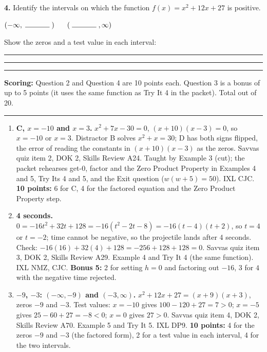 \documentclass[11pt]{article}
\newcommand{\workline}{\par\vspace{12pt}\noindent\rule{\linewidth}{0.4pt}\par}
\begin{document}
\vspace{6pt}
\textbf{4.} Identify the intervals on which the function $f(x)=x^2+12x+27$ is positive.

\vspace{8pt}
\hspace{2em}$\Large(-\infty,\;\rule{1.2cm}{0.4pt}\;)$ \  \ $(\;\rule{1.2cm}{0.4pt}\;,\infty)$

\vspace{4pt}
Show the zeros and a test value in each interval:
\workline
\workline
\workline

\vfill
\noindent\textbf{Scoring:} Question 2 and Question 4 are 10 points each. Question 3 is a bonus of up to 5 points (it uses the same function as Try It 4 in the packet). Total out of 20.

\newpage
{}

\vspace{4pt}\noindent\rule{\textwidth}{0.6pt}

\begin{enumerate}
\item[\textbf{2.}] \textbf{C, $x=-10$ and $x=3$.} $x^2+7x-30=0$, $(x+10)(x-3)=0$, so $x=-10$ or $x=3$. Distractor B solves $x^2+x=30$; D has both signs flipped, the error of reading the constants in $(x+10)(x-3)$ as the zeros. Savvas quiz item 2, DOK 2, Skills Review A24. Taught by Example 3 (cut); the packet rehearses get-0, factor and the Zero Product Property in Examples 4 and 5, Try Its 4 and 5, and the Exit question ($w(w+5)=50$). IXL CJC. \textbf{10 points:} 6 for C, 4 for the factored equation and the Zero Product Property step.
\item[\textbf{3.}] \textbf{4 seconds.} $0=-16t^2+32t+128=-16(t^2-2t-8)=-16(t-4)(t+2)$, so $t=4$ or $t=-2$; time cannot be negative, so the projectile lands after 4 seconds. Check: $-16(16)+32(4)+128=-256+128+128=0$. Savvas quiz item 3, DOK 2, Skills Review A29. Example 4 and Try It 4 (the same function). IXL NMZ, CJC. \textbf{Bonus 5:} 2 for setting $h=0$ and factoring out $-16$, 3 for $4$ with the negative time rejected.
\item[\textbf{4.}] \textbf{$-9$, $-3$: $(-\infty,-9)$ and $(-3,\infty)$.} $x^2+12x+27=(x+9)(x+3)$, zeros $-9$ and $-3$. Test values: $x=-10$ gives $100-120+27=7>0$; $x=-5$ gives $25-60+27=-8<0$; $x=0$ gives $27>0$. Savvas quiz item 4, DOK 2, Skills Review A70. Example 5 and Try It 5. IXL DP9. \textbf{10 points:} 4 for the zeros $-9$ and $-3$ (the factored form), 2 for a test value in each interval, 4 for the two intervals.
\end{enumerate}
\end{document}
